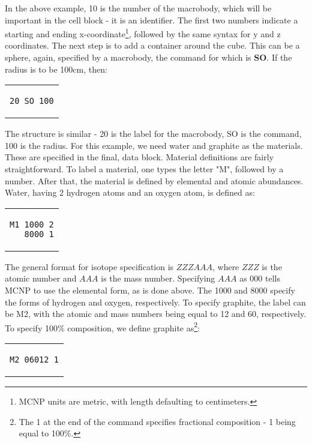 In the above example, 10 is the number of the macrobody, which will be important in the cell block - it is an identifier. The first two numbers indicate a starting and ending x-coordinate\footnote{MCNP units are metric, with length defaulting to centimeters.}, followed by the same syntax for y and z coordinates. The next step is to add a container around the cube. This can be a sphere, again, specified by a macrobody, the command for which is \textbf{SO}. If the radius is to be 100cm, then:

\begin{center}
\begin{tabular}{c}
\begin{lstlisting}
20 SO 100
\end{lstlisting}
\end{tabular}
\end{center}

The structure is similar - 20 is the label for the macrobody, SO is the command, 100 is the radius. For this example, we need water and graphite as the materials. These are specified in the final, data block. Material definitions are fairly straightforward. To label a material, one types the letter "M", followed by a number. After that, the material is defined by elemental and atomic abundances. Water, having 2 hydrogen atoms and an oxygen atom, is defined as:

\begin{center}
\begin{tabular}{c}
\begin{lstlisting}
M1 1000 2
   8000 1
\end{lstlisting}
\end{tabular}
\end{center}

The general format for isotope specification is $ZZZAAA$, where $ZZZ$ is the atomic number and $AAA$ is the mass number. Specifying $AAA$ as 000 tells MCNP to use the elemental form, as is done above. The 1000 and 8000 specify the forms of hydrogen and oxygen, respectively. To specify graphite, the label can be M2, with the atomic and mass numbers being equal to 12 and 60, respectively. To specify 100\% composition, we define graphite as\footnote{The 1 at the end of the command specifies fractional composition - 1 being equal to 100\%.}:

\begin{center}
\begin{tabular}{c}
\begin{lstlisting}
M2 06012 1
\end{lstlisting}
\end{tabular}
\end{center}

